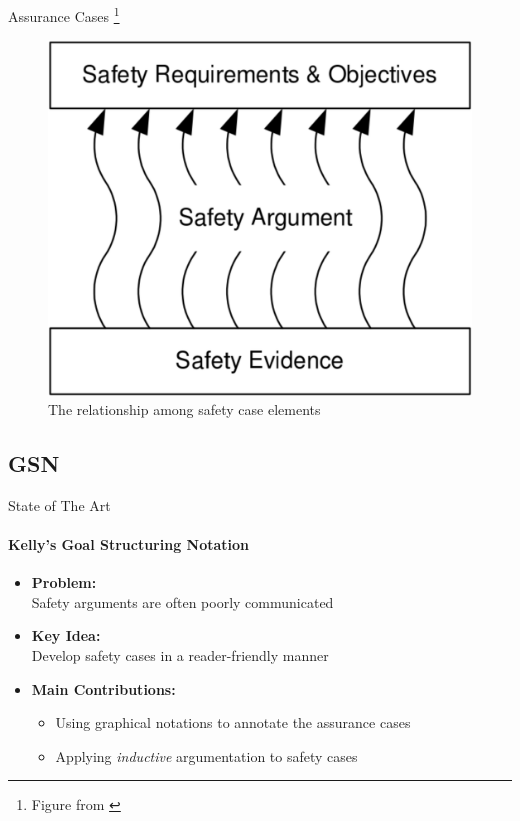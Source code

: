 \documentclass[xcolor=x11names,compress]{beamer}
\renewcommand{\(}{\begin{columns}}
\renewcommand{\)}{\end{columns}}
\newcommand{\<}[1]{\begin{column}{#1}}
\renewcommand{\>}{\end{column}}
\begin{document}

\begin{frame}{Assurance Cases \footnote{Figure from \cite{Kelly:GSN}}}
\begin{figure}
\includegraphics[scale=0.3]{figures/assurance-case}
\caption{The relationship among safety case elements}
\end{figure}
\end{frame}


\subsection{GSN}
\begin{frame}{State of The Art}
\framesubtitle{Kelly's Goal Structuring Notation \cite{Kelly:GSN}}
\begin{itemize}
\item \textbf{Problem:}\\Safety arguments are often poorly communicated
\item \textbf{Key Idea:} \\Develop safety cases in a reader-friendly manner
\item \textbf{Main Contributions:}
\begin{itemize}
    \item Using graphical notations to annotate the assurance cases
    \item Applying \emph{inductive} argumentation to safety cases
\end{itemize}
\end{itemize}
\end{frame}
\end{document}
